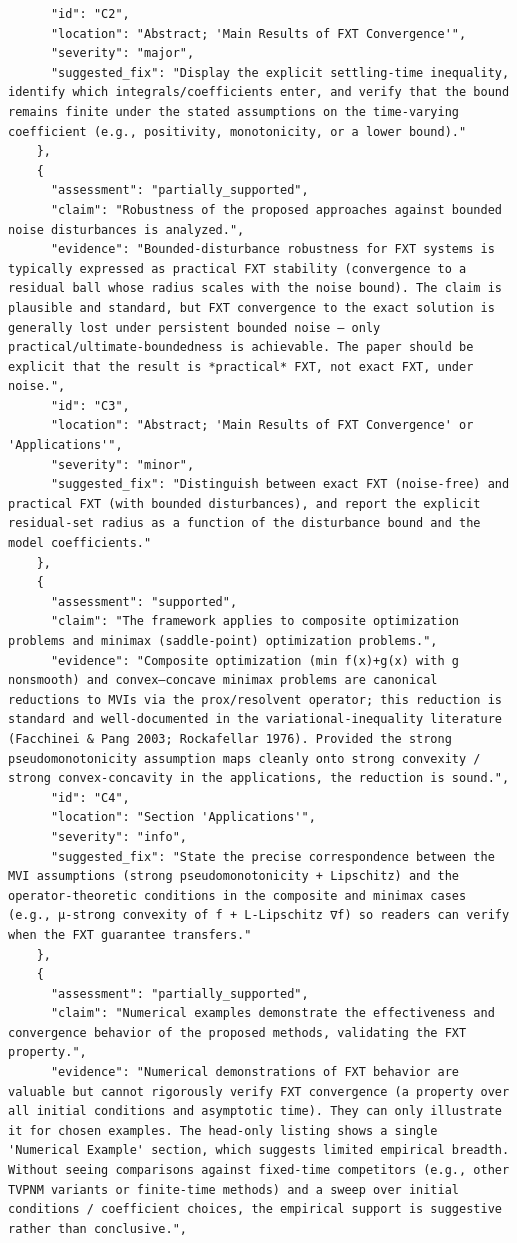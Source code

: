 \documentclass[11pt]{article}
\begin{document}
\begin{verbatim}
      "id": "C2",
      "location": "Abstract; 'Main Results of FXT Convergence'",
      "severity": "major",
      "suggested_fix": "Display the explicit settling-time inequality, identify which integrals/coefficients enter, and verify that the bound remains finite under the stated assumptions on the time-varying coefficient (e.g., positivity, monotonicity, or a lower bound)."
    },
    {
      "assessment": "partially_supported",
      "claim": "Robustness of the proposed approaches against bounded noise disturbances is analyzed.",
      "evidence": "Bounded-disturbance robustness for FXT systems is typically expressed as practical FXT stability (convergence to a residual ball whose radius scales with the noise bound). The claim is plausible and standard, but FXT convergence to the exact solution is generally lost under persistent bounded noise — only practical/ultimate-boundedness is achievable. The paper should be explicit that the result is *practical* FXT, not exact FXT, under noise.",
      "id": "C3",
      "location": "Abstract; 'Main Results of FXT Convergence' or 'Applications'",
      "severity": "minor",
      "suggested_fix": "Distinguish between exact FXT (noise-free) and practical FXT (with bounded disturbances), and report the explicit residual-set radius as a function of the disturbance bound and the model coefficients."
    },
    {
      "assessment": "supported",
      "claim": "The framework applies to composite optimization problems and minimax (saddle-point) optimization problems.",
      "evidence": "Composite optimization (min f(x)+g(x) with g nonsmooth) and convex–concave minimax problems are canonical reductions to MVIs via the prox/resolvent operator; this reduction is standard and well-documented in the variational-inequality literature (Facchinei & Pang 2003; Rockafellar 1976). Provided the strong pseudomonotonicity assumption maps cleanly onto strong convexity / strong convex-concavity in the applications, the reduction is sound.",
      "id": "C4",
      "location": "Section 'Applications'",
      "severity": "info",
      "suggested_fix": "State the precise correspondence between the MVI assumptions (strong pseudomonotonicity + Lipschitz) and the operator-theoretic conditions in the composite and minimax cases (e.g., µ-strong convexity of f + L-Lipschitz ∇f) so readers can verify when the FXT guarantee transfers."
    },
    {
      "assessment": "partially_supported",
      "claim": "Numerical examples demonstrate the effectiveness and convergence behavior of the proposed methods, validating the FXT property.",
      "evidence": "Numerical demonstrations of FXT behavior are valuable but cannot rigorously verify FXT convergence (a property over all initial conditions and asymptotic time). They can only illustrate it for chosen examples. The head-only listing shows a single 'Numerical Example' section, which suggests limited empirical breadth. Without seeing comparisons against fixed-time competitors (e.g., other TVPNM variants or finite-time methods) and a sweep over initial conditions / coefficient choices, the empirical support is suggestive rather than conclusive.",

\end{verbatim}
\end{document}
